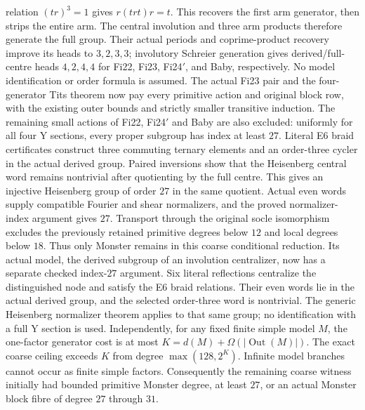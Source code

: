 relation $(tr)^3=1$ gives $r(trt)r=t$. This recovers the first arm
generator, then strips the entire arm. The central involution and three
arm products therefore generate the full group. Their actual periods
and coprime-product recovery improve its heads to $3,2,3,3$; involutory
Schreier generation gives derived/full-centre heads $4,2,4,4$ for
Fi22, Fi23, Fi24$'$, and Baby, respectively. No model identification or
order formula is assumed.
The actual Fi23 pair and the four-generator Tits theorem now pay every
primitive action and original block row, with the existing outer bounds
and strictly smaller transitive induction. The remaining small actions
of Fi22, Fi24$'$ and Baby are also excluded: uniformly for all four Y
sections, every proper subgroup has index at least $27$. Literal E6
braid certificates construct three commuting ternary elements and an
order-three cycler in the actual derived group. Paired inversions show
that the Heisenberg central word remains nontrivial after quotienting
by the full centre. This gives an injective Heisenberg group of order
$27$ in the same quotient. Actual even words supply compatible Fourier
and shear normalizers, and the proved normalizer-index argument gives
$27$. Transport through the original socle isomorphism excludes the
previously retained primitive degrees below $12$ and local degrees
below $18$. Thus only Monster remains in this coarse conditional
reduction. Its actual model, the derived subgroup of an involution
centralizer, now has a separate checked index-$27$ argument. Six literal
reflections centralize the distinguished node and satisfy the E6 braid
relations. Their even words lie in the actual derived group, and the
selected order-three word is nontrivial. The generic Heisenberg
normalizer theorem applies to that same group; no identification with
a full Y section is used. Independently, for any fixed finite simple
model $M$, the one-factor generator cost is at most
$K=d(M)+\Omega(|\operatorname{Out}(M)|)$. The exact coarse ceiling
exceeds $K$ from degree $\max(128,2^K)$. Infinite model branches cannot
occur as finite simple factors. Consequently the remaining coarse
witness initially had bounded primitive Monster degree, at least $27$,
or an actual Monster block fibre of degree $27$ through $31$.

